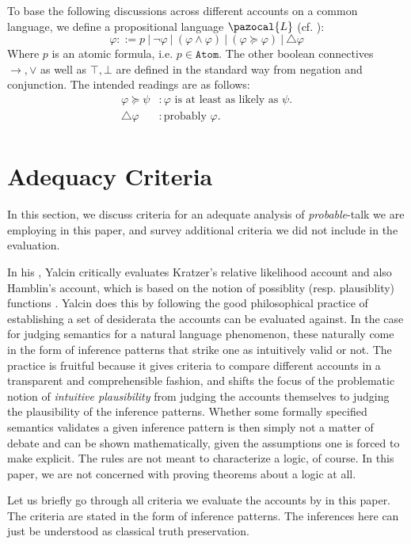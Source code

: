 \documentclass{article}
\theoremstyle{definition}
\renewcommand{\L}{\pazocal{L}}
\begin{document}
To base the following discussions across different accounts on a common language, we define a propositional language $\L$ (cf. \cite{harrison-trainor17_prefer}):
\[
\varphi ::= p ~|~ \neg \varphi ~|~ (\varphi \land \varphi) ~|~  (\varphi \succeq \varphi) ~|~ \triangle\varphi 
\]
Where $p$ is an atomic formula, i.e. $p \in \texttt{Atom}$. The other boolean connectives $\rightarrow, \vee$ as well as $\top, \bot$ are defined in the standard way from negation and conjunction.
The intended readings are as follows:
\begin{align*}
  \varphi \succeq \psi &: \varphi \text{ is at least as likely as } \psi. \\
  \triangle \varphi &:\text{probably } \varphi. \\ 
\end{align*}

\section{Adequacy Criteria}
In this section, we discuss criteria for an adequate analysis of \emph{probable}-talk we are employing in this paper, and survey additional criteria we did not include in the evaluation.

In his \parencite*{yalcin10_probab_operat}, Yalcin critically evaluates Kratzer's relative likelihood account and also Hamblin's account, which is based on the notion of possiblity (resp. plausiblity) functions \parencite{hamblin59_modal_probab}.
Yalcin does this by following the good philosophical practice of establishing a set of desiderata the accounts can be evaluated against. In the case for judging semantics for a natural language phenomenon, these naturally come in the form of inference patterns that strike one as intuitively valid or not.
The practice is fruitful because it gives criteria to compare different accounts in a transparent and comprehensible fashion, and shifts the focus of the problematic notion of \emph{intuitive plausibility} from judging the accounts themselves to judging the plausibility of the inference patterns.
Whether some formally specified semantics validates a given inference pattern is then simply not a matter of debate and can be shown mathematically, given the assumptions one is forced to make explicit.   
The rules are not meant to characterize a logic, of course. In this paper, we are not concerned with proving theorems about a logic at all.

Let us briefly go through all criteria we evaluate the accounts by in this paper.
The criteria are stated in the form of inference patterns.
The inferences here can just be understood as classical truth preservation.
\end{document}
